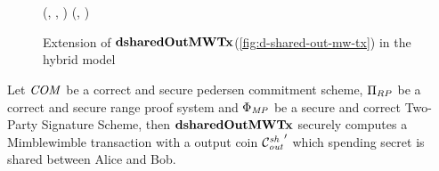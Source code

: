 \begin{figure}
\begin{center}
{\begin{varwidth}{\textwidth}
{            \varTx \opFunResult \procFinTx{\funStarAlt{\varPreTx}}{\varSecKeyAlice}{\varNonceAlice} \\
            \< \sendmessageright*{\varTx} \\
            \pcreturn (\varTx, \funStar{\varSpendableCoinAlice}, \funStar{\varPtSpendableCoinAlice}) \< \< \pcreturn (\varTx, \funStar{\varPtSpendableCoinBob})
            }
        \end{varwidth}
        }
    \end{center}
    \caption{Extension of $\mathbf{dsharedOutMWTx}$(\cref{fig:d-shared-out-mw-tx}) in the hybrid model}  \label{fig:atom:hybrid-sharedinp}
\end{figure}

\begin{theorem}
    \label{teo:atom:sec-sharedout-tx}
    Let $\mathit{COM}$ be a correct and secure pedersen commitment scheme, $\Pi_{RP}$ be a correct and secure range proof system and $\Phi_{\mathit{MP}}$ be a secure and correct Two-Party Signature Scheme, then $\mathbf{dsharedOutMWTx}$ securely computes a Mimblewimble transaction with a output coin ${\mathcal{C}_{\mathit{out}}^{\mathit{sh}}}'$ which spending secret is shared between Alice and Bob.
\end{theorem}

